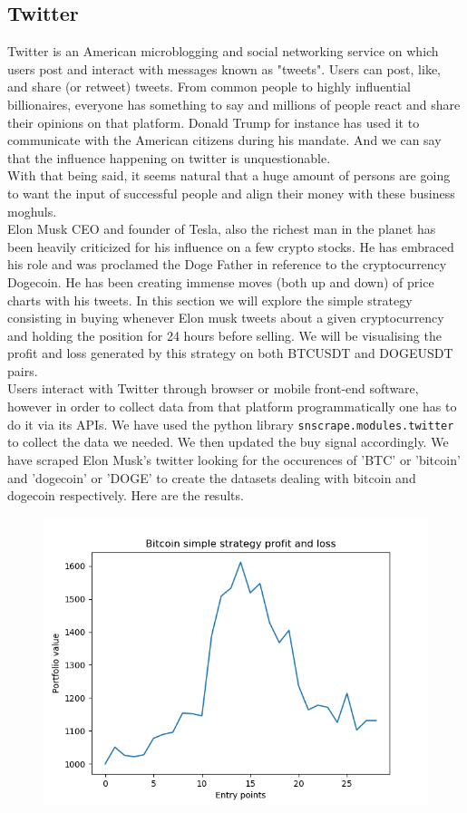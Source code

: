 \documentclass[twoside]{report}
\newcommand{\code}{\texttt}
\begin{document}
\begin{spacing}{1}
\section{Twitter}
Twitter is an American microblogging and social networking service on which users post and interact with messages known as "tweets". Users can post, like, and share (or retweet) tweets.
From common people to highly influential billionaires, everyone has something to say and millions of people react and share their opinions on that platform. Donald Trump for instance has used it to communicate with the American citizens during his mandate. And we can say that the influence happening on twitter is unquestionable.\\
With that being said, it seems natural that a huge amount of persons are going to want the input of successful people and align their money with these business moghuls.\\
Elon Musk CEO and founder of Tesla, also the richest man in the planet has been heavily criticized for his influence on a few crypto stocks. He has embraced his role and was proclamed the Doge Father in reference to the cryptocurrency Dogecoin. He has been creating immense moves (both up and down) of price charts with his tweets. 
In this section we will explore the simple strategy consisting in buying whenever Elon musk tweets about a given cryptocurrency and holding the position for 24 hours before selling.
We will be visualising the profit and loss generated by this strategy on both BTCUSDT and DOGEUSDT pairs.\\
Users interact with Twitter through browser or mobile front-end software, however in order to collect data from that platform programmatically one has to do it via its APIs.
We have used the python library \code{snscrape.modules.twitter} to collect the data we needed. We then updated the buy signal accordingly. We have scraped Elon Musk's twitter looking for the occurences of 'BTC' or 'bitcoin' and 'dogecoin' or 'DOGE' to create the datasets dealing with bitcoin and dogecoin respectively. Here are the results. \\
\begin{figure}[!htbp]
    \centering
    \includegraphics[scale = 0.5]{TestPlots/plot-BTC-pnl.png}
    \caption{}
    \label{}
\end{figure}


\end{spacing}
\end{document}
